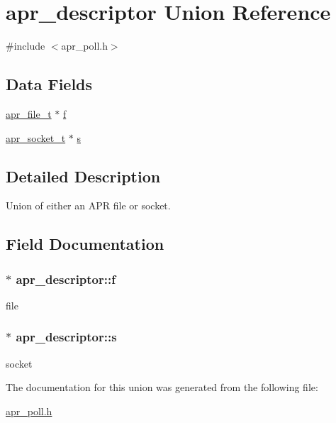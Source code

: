 \hypertarget{unionapr__descriptor}{}\section{apr\+\_\+descriptor Union Reference}
\label{unionapr__descriptor}


{\ttfamily \#include $<$apr\+\_\+poll.\+h$>$}

\subsection*{Data Fields}
\begin{DoxyCompactItemize}
\item 
\hyperlink{group__apr__file__io_gaa46e4763ac375ea3c7a43ba6f6099e22}{apr\+\_\+file\+\_\+t} $\ast$ \hyperlink{unionapr__descriptor_a69d605f2bb33b05ceedb3d95b744ca7e}{f}
\item 
\hyperlink{group__apr__network__io_ga49262b223e7434746e1f1737659aa2c3}{apr\+\_\+socket\+\_\+t} $\ast$ \hyperlink{unionapr__descriptor_a39a15be8be084afadfa173810b346f6c}{s}
\end{DoxyCompactItemize}


\subsection{Detailed Description}
Union of either an A\+PR file or socket. 

\subsection{Field Documentation}
\subsubsection[{\texorpdfstring{f}{f}}]{$\ast$ apr\+\_\+descriptor\+::f}\hypertarget{unionapr__descriptor_a69d605f2bb33b05ceedb3d95b744ca7e}{}\label{unionapr__descriptor_a69d605f2bb33b05ceedb3d95b744ca7e}
file 
\subsubsection[{\texorpdfstring{s}{s}}]{$\ast$ apr\+\_\+descriptor\+::s}\hypertarget{unionapr__descriptor_a39a15be8be084afadfa173810b346f6c}{}\label{unionapr__descriptor_a39a15be8be084afadfa173810b346f6c}
socket 

The documentation for this union was generated from the following file\+:\begin{DoxyCompactItemize}
\item 
\hyperlink{apr__poll_8h}{apr\+\_\+poll.\+h}\end{DoxyCompactItemize}
